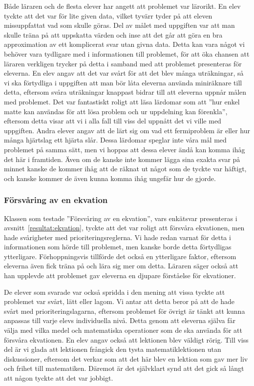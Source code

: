     \textcolor{lila}{Både läraren och de flesta elever har angett att problemet var lärorikt. En elev tyckte att det var för lite given data, vilket tyvärr tyder på att eleven missuppfattat vad som skulle göras. Del av målet med uppgiften var att man skulle träna på att uppskatta värden och inse att det går att göra en bra  approximation av ett komplicerat svar utan givna data. Detta kan vara något vi behöver vara tydligare med i informationen till problemet, för att öka chansen att läraren verkligen trycker på detta i samband med att problemet presenteras för eleverna. En elev angav att det var svårt för att det blev många uträkningar, så vi ska förtydliga i uppgiften att man bör låta eleverna använda miniräknare till detta, eftersom svåra uträkningar knappast bidrar till att eleverna uppnår målen med problemet. Det var fantastiskt roligt att läsa lärdomar som att ''hur enkel matte kan användas för att lösa problem och ur uppdelning kan förenkla'', eftersom detta visar att vi i alla fall till viss del uppnått det vi ville med uppgiften. Andra elever angav att de lärt sig om vad ett fermiproblem är eller hur många hjärtslag ett hjärta slår. Dessa lärdomar speglar inte våra mål med problemet på samma sätt, men vi hoppas att dessa elever ändå kan komma ihåg det här i framtiden. Även om de kanske inte kommer lägga sina exakta svar på minnet kanske de kommer ihåg att de räknat ut något som de tyckte var häftigt, och kanske kommer de även kunna komma ihåg ungefär hur de gjorde.}

\subsubsection{Försvåring av en ekvation}
    \textcolor{lila}{Klassen som testade ''Försvåring av en ekvation'', vars enkätsvar presenteras i avsnitt~\ref{resultat:ekvation}, tyckte att det var roligt att försvåra ekvationen, men hade svårigheter med prioriteringsreglerna. Vi hade redan varnat för detta i informationen som hörde till problemet, men kanske borde  detta förtydligas ytterligare. Förhoppningsvis tillförde det också en ytterligare faktor, eftersom eleverna även fick träna på och lära sig mer om detta. Läraren säger också att han upplevde att problemet gav eleverna en djupare förståelse för ekvationer.}
    
    \textcolor{lila}{De elever som svarade var också spridda i den mening att vissa tyckte att problemet var svårt, lätt eller lagom. Vi antar att detta beror på att de hade svårt med prioriteringslagarna, eftersom problemet för övrigt är tänkt att kunna anpassas till varje elevs individuella nivå. Detta genom att eleverna själva får välja med vilka medel och matematiska operationer som de ska använda för att försvåra ekvationen. En elev angav också att lektionen blev väldigt rörig. Till viss del är vi glada att lektionen frångick den tysta matematiklektionen utan diskussioner, eftersom det verkar som att det här blev en lektion som gav mer liv och frihet till matematiken. Däremot är det självklart synd att det gick så långt att någon tyckte att det var jobbigt.}

